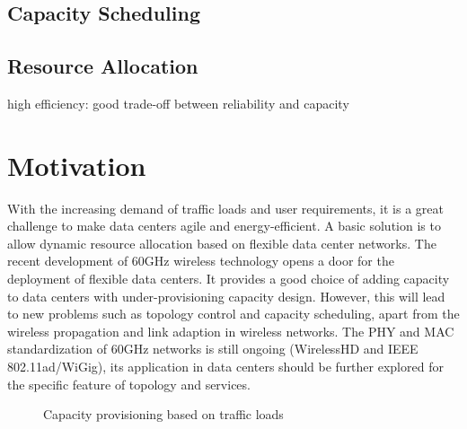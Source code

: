 \documentclass[journal,onecolumn,11pt]{IEEEtran}
\begin{document}
\subsection{Capacity Scheduling}

\subsection{Resource Allocation}

high efficiency: good trade-off between reliability and capacity

\section{Motivation}

With the increasing demand of traffic loads and user requirements, it is a great challenge to make data centers agile and energy-efficient. A basic solution is to allow dynamic resource allocation based on flexible data center networks. The recent development of 60GHz wireless technology opens a door for the deployment of flexible data centers. It provides a good choice of adding capacity to data centers with under-provisioning capacity design. However, this will lead to new problems such as topology control and capacity scheduling, apart from the wireless propagation and link adaption in wireless networks. The PHY and MAC standardization of 60GHz networks is still ongoing (WirelessHD and IEEE 802.11ad/WiGig), its application in data centers should be further explored for the specific feature of topology and services.

\begin{figure}[!htp]
\centerline{
}
\caption{Capacity provisioning based on traffic loads}
\label{provisioning}
\end{figure}
\end{document}
